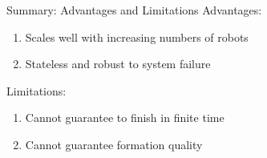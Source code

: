 \begin{frame}{Summary: Advantages and Limitations}
        Advantages:
            \begin{enumerate}
            \item Scales well with increasing numbers of robots
            \item Stateless and robust to system failure
            \end{enumerate}
        Limitations:
            \begin{enumerate}
            \item Cannot guarantee to finish in finite time 
            \item Cannot guarantee formation quality 
            \end{enumerate}
      

\end{frame}